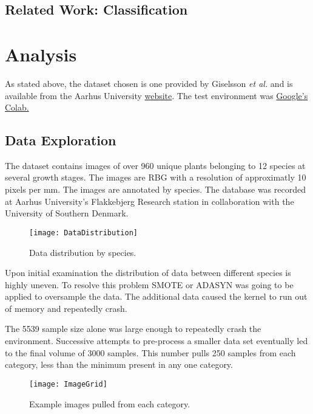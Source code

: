 \documentclass[]{article}
\begin{document}
\subsection{Related Work: Classification}

\section{Analysis}

As stated above, the dataset chosen is one provided by Giselsson \emph{et al.}\cite{Giselsson2017} and is available from the Aarhus University 
\href{https://vision.eng.au.dk/plant-seedlings-dataset/}{website}.
The test environment was \href{https://colab.research.google.com/}{Google's Colab.}

\subsection{Data Exploration}

The dataset contains images of over 960 unique plants belonging to 12 species at several growth stages. 
The images are RBG with a resolution of approximatly 10 pixels per mm.
The images are annotated by species.
The database was recorded at Aarhus University's Flakkebjerg Research station in  collaboration with the University of Southern Denmark.

\begin{wrapfigure}{l}{0.5\textwidth}
	\begin{center}
		\texttt{[image: DataDistribution]}
	\end{center}
	\caption{Data distribution by species.}
\end{wrapfigure}
Upon initial examination the distribution of data between different species is highly uneven.
To resolve this problem SMOTE\cite{Bowyer2011} or ADASYN\cite{Bai2008}  was going to be applied to oversample the data.
The additional data caused the kernel to run out of memory and repeatedly crash.

The 5539 sample size alone was large enough to repeatedly crash the environment.
Successive attempts to pre-process a smaller data set eventually led to the final volume of 3000 samples. 
This number pulls 250 samples from each category, less than the minimum present in any one category. 

\begin{figure}[H]
	\texttt{[image: ImageGrid]}
	\caption{Example images pulled from each category.}
\end{figure}
\end{document}
